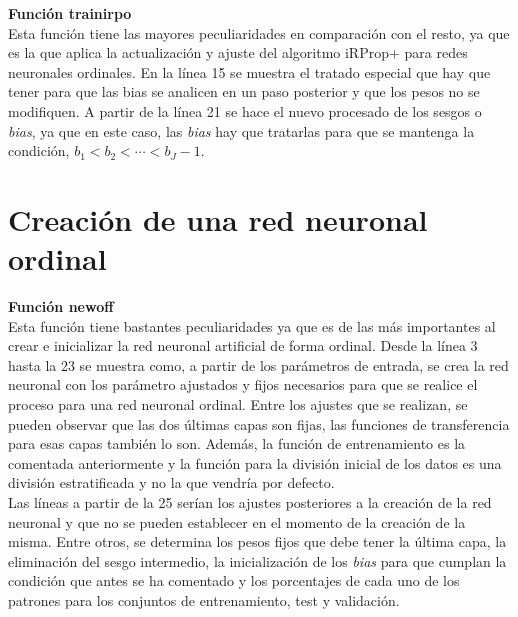 		\textbf{Función trainirpo}\\
		
		Esta función tiene las mayores peculiaridades en comparación con el resto, ya que es la que aplica la actualización y ajuste del algoritmo iRProp+ para redes neuronales ordinales. En la línea 15 se muestra el tratado especial que hay que tener para que las bias se analicen en un paso posterior y que los pesos no se modifiquen. A partir de la línea 21 se hace el nuevo procesado de los sesgos o \textit{bias}, ya que en este caso, las \textit{bias} hay que tratarlas para que se mantenga la condición, $b_1 < b_2 < \cdots < b_J-1$.\\
		
		
		
	\section{Creación de una red neuronal ordinal}
	
		\textbf{Función newoff}\\
		
		Esta función tiene bastantes peculiaridades ya que es de las más importantes al crear e inicializar la red neuronal artificial de forma ordinal. Desde la línea 3 hasta la 23 se muestra como, a partir de los parámetros de entrada, se crea la red neuronal con los parámetro ajustados y fijos necesarios para que se realice el proceso para una red neuronal ordinal. Entre los ajustes que se realizan, se pueden observar que las dos últimas capas son fijas, las funciones de transferencia para esas capas también lo son. Además, la función de entrenamiento es la comentada anteriormente y la función para la división inicial de los datos es una división estratificada y no la que vendría por defecto.\\
		
		Las líneas a partir de la 25 serían los ajustes posteriores a la creación de la red neuronal y que no se pueden establecer en el momento de la creación de la misma. Entre otros, se determina los pesos fijos que debe tener la última capa, la eliminación del sesgo intermedio, la inicialización de los \textit{bias} para que cumplan la condición que antes se ha comentado y los porcentajes de cada uno de los patrones para los conjuntos de entrenamiento, test y validación.\\
		
		
		
